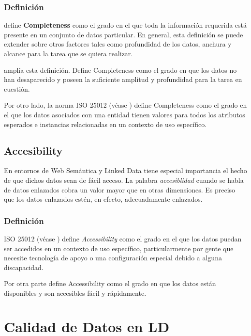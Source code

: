\subsubsection{Definición}

\cite{zaveri_quality_2013} define \textbf{Completeness} como el grado en el que toda la información
requerida está presente en un conjunto de datos particular. En general, esta
definición se puede extender sobre otros factores tales como profundidad de los
datos, anchura y alcance para la tarea que se quiera realizar. 

\cite{pipino_data_2002} amplía esta definición. Define Completeness como el
grado en que los datos no han desaparecido y poseen la suficiente amplitud y
profundidad para la tarea en cuestión. 

Por otro lado, la norma \acs{ISO} 25012 (véase \cite{citeulike:5717734}) define Completeness como el grado en el que
los datos asociados con una entidad tienen valores para todos los atributos
esperados e instancias relacionadas en un contexto de uso específico. 


\subsection{Accesibility}
\label{sbs:accessibility}

En entornos de Web Semántica y Linked Data tiene especial importancia el hecho
de que dichos datos sean de fácil acceso. La palabra \textit{accesiblidad}
cuando se habla de datos enlazados cobra un valor mayor que en otras
dimensiones. Es preciso que los datos enlazados estén, en efecto, adecuadamente
enlazados. 

\subsubsection{Definición} 


\acs{ISO} 25012 (véase \cite{citeulike:5717734}) define \textit{Accessibility} como el grado en el que los datos
puedan ser accedidos en un contexto de uso específico, particularmente por gente
 que necesite tecnología de apoyo o una configuración especial debido a alguna
 discapacidad. 

Por otra parte \cite{pipino_data_2002} define Accessibility como el
grado en que los datos están disponibles y son accesibles fácil y rápidamente. 


\section{Calidad de Datos en \acs{LD}}
\label{sec:lddq}

